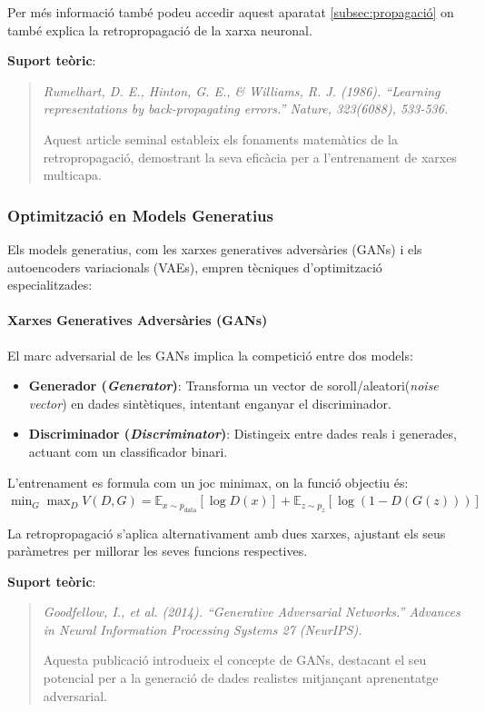 Per més informació també podeu accedir aquest  aparatat \ref{subsec:propagació} on també explica la retropropagació de la xarxa neuronal.

\textbf{Suport teòric}:
\begin{quote}
\textit{Rumelhart, D. E., Hinton, G. E., \& Williams, R. J. (1986). ``Learning representations by back-propagating errors.'' Nature, 323(6088), 533-536.}

Aquest article seminal estableix els fonaments matemàtics de la retropropagació, demostrant la seva eficàcia per a l'entrenament de xarxes multicapa.
\end{quote}

\subsubsection{Optimització en Models Generatius}
Els models generatius, com les xarxes generatives adversàries (GANs) i els autoencoders variacionals (VAEs), empren tècniques d'optimització especialitzades:

\paragraph{Xarxes Generatives Adversàries (GANs)}
El marc adversarial de les GANs implica la competició entre dos models:

\begin{itemize}
\item \textbf{Generador (\textit{Generator})}: Transforma un vector de soroll/aleatori(\textit{noise vector}) en dades sintètiques, intentant enganyar el discriminador.

\item \textbf{Discriminador (\textit{Discriminator})}: Distingeix entre dades reals i generades, actuant com un classificador binari.
\end{itemize}

L'entrenament es formula com un joc minimax, on la funció objectiu és:
$ \min_G \max_D V(D, G) = \mathbb{E}_{x \sim p_{\text{data}}}[\log D(x)] + \mathbb{E}_{z \sim p_z}[\log(1 - D(G(z)))] $

La retropropagació s'aplica alternativament amb dues xarxes, ajustant els seus paràmetres per millorar les seves funcions respectives.

\textbf{Suport teòric}:
\begin{quote}
\textit{Goodfellow, I., et al. (2014). ``Generative Adversarial Networks.'' Advances in Neural Information Processing Systems 27 (NeurIPS).}

Aquesta publicació introdueix el concepte de GANs, destacant el seu potencial per a la generació de dades realistes mitjançant aprenentatge adversarial.
\end{quote}

